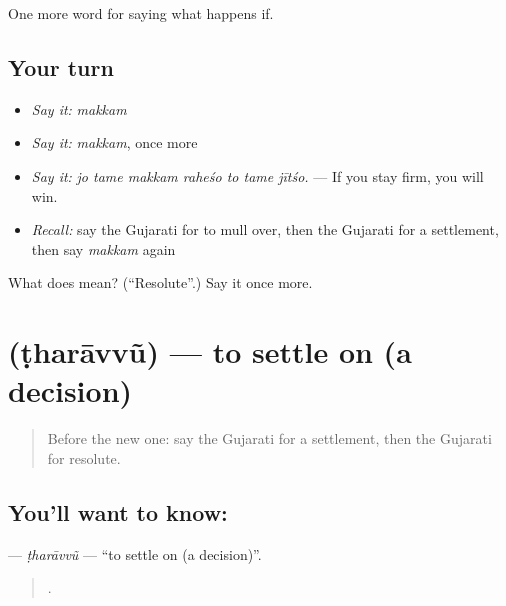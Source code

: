 \begin{grammarlens}[title={What you've built}]
One more word for saying what happens if.
\end{grammarlens}

\subsection*{Your turn}
\begin{itemize}
\raggedright
  \item \emph{Say it:} \emph{makkam}
  \item \emph{Say it:} \emph{makkam}, once more
  \item \emph{Say it:} \emph{jo tame makkam raheśo to tame jītśo.} — If you stay firm, you will win.
  \item \emph{Recall:} say the Gujarati for to mull over, then the Gujarati for a settlement, then say \emph{makkam} again
\end{itemize}

\begin{tcolorbox}[breakable,colback=teal!4,colframe=teal!35!black,title={Before you move on}]
What does  mean? (\textquotedblleft{}Resolute\textquotedblright{}.) Say it once more.
\end{tcolorbox}
\section[\texorpdfstring{\gu{ઠરાવવું} (ṭharāvvũ)}{ઠરાવવું (ṭharāvvũ)}]{ (ṭharāvvũ) — to settle on (a decision)}

\label{lesson:GU-C539-tharavvu}



\begin{quote}
Before the new one: say the Gujarati for a settlement, then the Gujarati for resolute.
\end{quote}

\subsection*{You'll want to know: }
\textbf{} — \emph{ṭharāvvũ} — \textquotedblleft{}to settle on (a decision)\textquotedblright{}.

\begin{quote}
          .
\end{quote}


